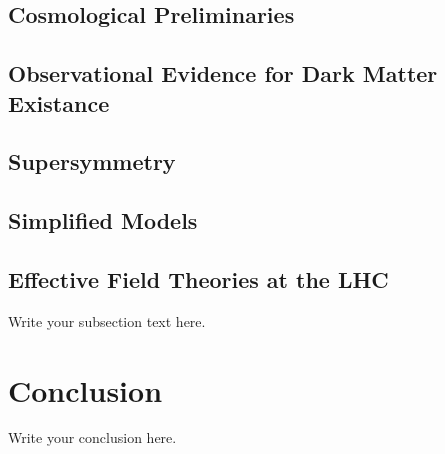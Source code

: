 \documentclass[draftfoot,preprint]{cit_thesis}
\begin{document}
\subsection{Cosmological Preliminaries}
\subsection{Observational Evidence for Dark Matter Existance}
\subsection{Supersymmetry}
\subsection{Simplified Models}
\subsection{Effective Field Theories at the LHC}

Write your subsection text here.

\section{Conclusion}
Write your conclusion here.
\end{document}
